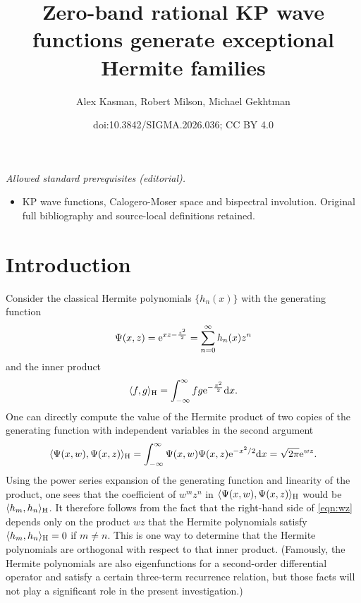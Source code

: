 \documentclass[10pt,a4paper]{amsart}
\title{Zero-band rational KP wave functions generate exceptional Hermite families}
\author{Alex Kasman, Robert Milson, Michael Gekhtman}
\date{doi:10.3842/SIGMA.2026.036; CC BY 4.0}
\numberwithin{equation}{section}
\theoremstyle{definition}
\begin{document}
\maketitle
\noindent\textit{Allowed standard prerequisites (editorial).}\begin{itemize}
\item KP wave functions, Calogero-Moser space and bispectral involution. Original full bibliography and source-local definitions retained.
\end{itemize}\medskip
\section{Introduction}


Consider the classical Hermite polynomials $\{h_n(x)\}$ with the generating function
\[
\Psi(x,z)={\rm e}^{xz-\frac{z^2}{2}}=\sum_{n=0}^{\infty} h_n(x)z^n
\]
and the inner product
\[
\langle f,g\rangle_{\rm H}=\int_{-\infty}^{\infty} f\relax{g}{\rm e}^{-\frac{x^2}{2}}{\rm d}x.\]
One can directly compute
 the value of the Hermite product of two copies of the generating function with
independent variables in the second argument
\begin{equation}\label{eqn:wz}
\langle \Psi(x,w),\Psi(x,z)\rangle_{\rm H}=\int_{-\infty}^{\infty} \Psi(x,w)\relax{\Psi(x,z)}{\rm e}^{-x^2/2}{\rm d}x=\sqrt{2\pi}{\rm e}^{wz}.
\end{equation}
Using the power series expansion of the generating function and
linearity of the product, one sees that the coefficient of $w^mz^n$ in $\langle
\Psi(x,w),\Psi(x,z)\rangle_{\rm H}$ would be $\langle h_m,h_n\rangle_{\rm H}$.
It therefore follows from the fact that the right-hand side of \eqref{eqn:wz}
 depends only on the product $wz$ that the Hermite polynomials satisfy
 $\langle h_m,h_n\rangle_{\rm H}=0$ if $m\not=n$. This is one way to
 determine that the Hermite polynomials are orthogonal with respect to
 that inner product.
(Famously,
 the Hermite polynomials are also eigenfunctions for a second-order
 differential operator and satisfy a certain three-term recurrence
 relation, but those facts will not play a significant role in the present investigation.)
\end{document}
